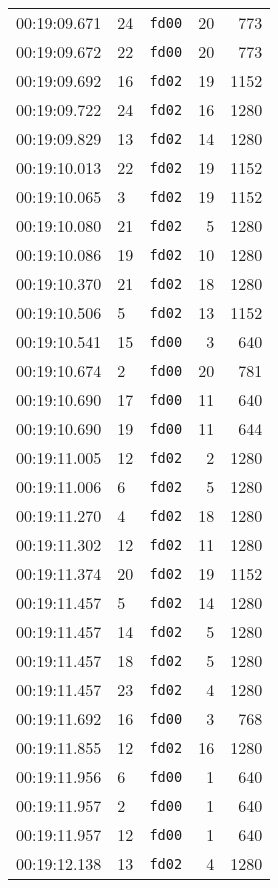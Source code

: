 \documentclass{article}
\begin{document}
\begin{longtable}{lllrr}
00:19:09.671 & 24 & \texttt{fd00} & 20 & 773 \\
00:19:09.672 & 22 & \texttt{fd00} & 20 & 773 \\
00:19:09.692 & 16 & \texttt{fd02} & 19 & 1152 \\
00:19:09.722 & 24 & \texttt{fd02} & 16 & 1280 \\
00:19:09.829 & 13 & \texttt{fd02} & 14 & 1280 \\
00:19:10.013 & 22 & \texttt{fd02} & 19 & 1152 \\
00:19:10.065 & 3 & \texttt{fd02} & 19 & 1152 \\
00:19:10.080 & 21 & \texttt{fd02} & 5 & 1280 \\
00:19:10.086 & 19 & \texttt{fd02} & 10 & 1280 \\
00:19:10.370 & 21 & \texttt{fd02} & 18 & 1280 \\
00:19:10.506 & 5 & \texttt{fd02} & 13 & 1152 \\
00:19:10.541 & 15 & \texttt{fd00} & 3 & 640 \\
00:19:10.674 & 2 & \texttt{fd00} & 20 & 781 \\
00:19:10.690 & 17 & \texttt{fd00} & 11 & 640 \\
00:19:10.690 & 19 & \texttt{fd00} & 11 & 644 \\
00:19:11.005 & 12 & \texttt{fd02} & 2 & 1280 \\
00:19:11.006 & 6 & \texttt{fd02} & 5 & 1280 \\
00:19:11.270 & 4 & \texttt{fd02} & 18 & 1280 \\
00:19:11.302 & 12 & \texttt{fd02} & 11 & 1280 \\
00:19:11.374 & 20 & \texttt{fd02} & 19 & 1152 \\
00:19:11.457 & 5 & \texttt{fd02} & 14 & 1280 \\
00:19:11.457 & 14 & \texttt{fd02} & 5 & 1280 \\
00:19:11.457 & 18 & \texttt{fd02} & 5 & 1280 \\
00:19:11.457 & 23 & \texttt{fd02} & 4 & 1280 \\
00:19:11.692 & 16 & \texttt{fd00} & 3 & 768 \\
00:19:11.855 & 12 & \texttt{fd02} & 16 & 1280 \\
00:19:11.956 & 6 & \texttt{fd00} & 1 & 640 \\
00:19:11.957 & 2 & \texttt{fd00} & 1 & 640 \\
00:19:11.957 & 12 & \texttt{fd00} & 1 & 640 \\
00:19:12.138 & 13 & \texttt{fd02} & 4 & 1280 \\

\end{longtable}
\end{document}
